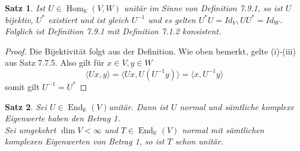 \documentclass[12pt,a4paper]{article}
\newtheorem{theorem}{Satz}
\theoremstyle{definition}
\theoremstyle{remark}
\DeclareMathOperator{\Hom}{Hom}
\DeclareMathOperator{\End}{End}
\begin{document}
	\begin{theorem}
		Ist $U \in \Hom_{\mathbb{K}}(V,W)$ unitär im Sinne von Definition 7.9.1, so ist $U$ bijektiv, $U^*$ existiert und ist gleich $U^{-1}$ und es gelten $U^*U=Id_{V}, UU^*= Id_W$. \\
		Folglich ist Definition 7.9.1 mit Definition 7.1.2 konsistent.
	\end{theorem}
	\begin{proof}
		Die Bijektivität folgt aus der Definition. Wie oben bemerkt, gelte (i)-(iii) aus Satz 7.7.5. Also gilt für $x \in V, y \in W$
		\begin{equation}
			\langle Ux,y \rangle = \langle Ux,U(U^{-1}y) \rangle = \langle x, U^{-1}y \rangle
		\end{equation}
		somit gilt $U^{-1} = U^*$
	\end{proof}
	\begin{theorem}
			Sei $U \in \End_{\mathbb{K}}(V)$unitär. Dann ist $U$ normal und sämtliche komplexe Eigenwerte haben den Betrag 1.\\
			Sei umgekehrt $\dim V<\infty$ und $T \in \End_{\mathbb{K}}(V)$ normal mit sämtlichen komplexen Eigenwerten von Betrag 1, so ist $T$ schon unitär.			
	\end{theorem}
\end{document}
